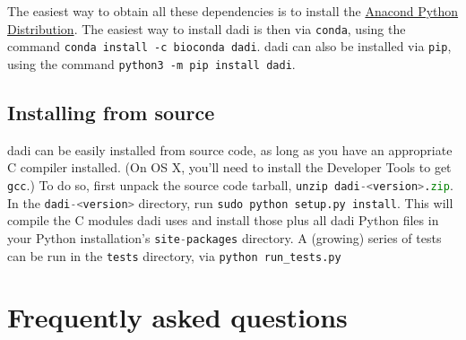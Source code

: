 \documentclass[12pt]{article}
\makeatletter
\newcommand{\dadi}{dadi\xspace}
\newcommand{\py}[1]{\lstinline[language=Python, showstringspaces=False]@#1@}
\makeatother
\begin{document}
The easiest way to obtain all these dependencies is to install the \href{https://www.anaconda.com/distribution/}{Anacond Python Distribution}.
The easiest way to install \dadi is then via \texttt{conda}, using the command \texttt{conda install -c bioconda dadi}.
\dadi can also be installed via \texttt{pip}, using the command \texttt{python3 -m pip install dadi}.

\subsection{Installing from source}

\dadi can be easily installed from source code, as long as you have an appropriate C compiler installed. (On OS X, you'll need to install the Developer Tools to get \py{gcc}.) To do so, first unpack the source code tarball, \py{unzip dadi-<version>.zip}.
In the \py{dadi-<version>} directory, run \py{sudo python setup.py install}.
This will compile the C modules \dadi uses and install those plus all \dadi Python files in your Python installation's \py{site-packages} directory.
A (growing) series of tests can be run in the \py{tests} directory, via \py{python run_tests.py}

\section{Frequently asked questions}
\end{document}
